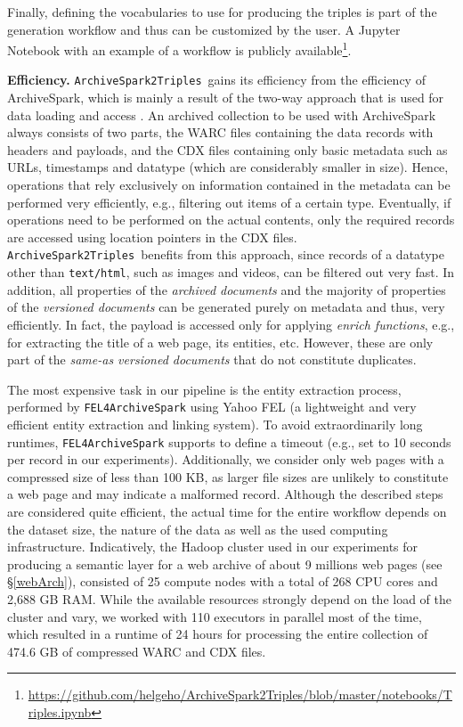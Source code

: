 \documentclass{libtex/sig-alternate-05-2015}
\newcommand{\tool}[0]{{\tt ArchiveSpark2Triples}}
\begin{document}
Finally, defining the vocabularies to use for producing the triples is part of the
generation workflow and thus can be customized by the user.
A Jupyter Notebook with an example of a workflow is
publicly available\footnote{\url{https://github.com/helgeho/ArchiveSpark2Triples/blob/master/notebooks/Triples.ipynb}}.


\vspace{1mm} \noindent
{\bf Efficiency.}
\tool\ gains its efficiency from the efficiency of ArchiveSpark,
which is mainly a result of the two-way approach
that is used for data loading and access \cite{holzmann2016archivespark}.
An archived collection to be used with ArchiveSpark always consists of two parts,
the WARC files containing the data records with headers and payloads, %
and the CDX files containing only basic metadata
such as URLs, timestamps and datatype (which are considerably smaller in size).
Hence, operations that rely exclusively on information contained in the metadata
can be performed very efficiently,
e.g., filtering out items of a certain type.
Eventually, if operations need to be performed on the actual contents,
only the required records are accessed using location pointers in the CDX files.
\tool\ benefits from this approach,
since records of a datatype other than \texttt{text/html},
such as images and videos, can be filtered out very fast.
In addition,
all properties of the {\em archived documents} and the majority of properties
of the {\em versioned documents} can be generated purely on metadata and thus, very efficiently.
In fact, the payload is accessed only for applying {\em enrich functions},
e.g., for extracting the title of a web page, its entities, etc.
However, these are only part of the {\em same-as versioned documents}
that do not constitute duplicates.

The most expensive task in our pipeline is the entity extraction process,
performed by {\tt FEL4ArchiveSpark} using Yahoo FEL \cite{BlancoWSDM2015}
(a lightweight and very efficient entity extraction and linking system).
To avoid extraordinarily long runtimes,
{\tt FEL4ArchiveSpark} supports to define a timeout
(e.g., set to 10 seconds per record in our experiments).
Additionally, we consider only web pages with a compressed size of less than 100 KB,
as larger file sizes are unlikely to constitute a web page and may indicate a malformed record.
Although the described steps are considered quite efficient,
the actual time for the entire workflow depends on the dataset size,
the nature of the data as well as the used computing infrastructure.
Indicatively, the Hadoop cluster used in our experiments for
producing a semantic layer for a web archive
of about 9 millions web pages (see \S \ref{webArch}),
consisted of 25 compute nodes
with a total of 268 CPU cores and 2,688 GB RAM.
While the available resources strongly depend on
the load of the cluster and vary,
we worked with 110 executors in parallel most of the time,
which resulted in a runtime of 24 hours for
processing the entire collection of 474.6 GB of compressed WARC and CDX files.
\end{document}

